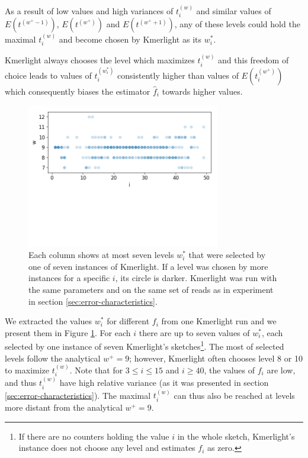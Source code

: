As a result of low values and high variances of $t_i^{(w)}$ and similar
values of $E(t^{(w^+-1)})$, $E(t^{(w^+)})$ and $E(t^{(w^++1)})$, any of these levels could
hold the maximal $t_i^{(w)}$ and become chosen by Kmerlight as its $w^*_i$. 

Kmerlight always chooses the level which maximizes $t_i^{(w)}$ and this freedom of choice 
leads to values of $t_i^{(w^*_i)}$ consistently higher than values of $E(t_i^{(w^+)})$
which consequently biases the estimator $\hat f_i$ towards higher values.

\begin{figure}[h]
\centerline{\includegraphics[width=0.75\textwidth, trim={0cm, 5.2cm, 0cm, 0cm}, clip]{images/kmerlight_wstar.png}}
\caption[$w_i^*$ selected by Kmerlight]{Each column 
shows at most seven levels $w_i^*$ that were selected by one of seven instances of Kmerlight.
If a level was chosen by more instances for a specific $i$, its circle is darker.
Kmerlight was run with the same parameters and on the same set of reads as in 
experiment in section \ref{sec:error-characteristics}.}
\label{img:w-selected-by-kmerlight}
\end{figure}

We extracted the values $w_i^*$ for different $f_i$ from one Kmerlight run
and we present them in Figure \ref{img:w-selected-by-kmerlight}.
For each $i$ there are up to seven values of $w_i^*$, each selected by one 
instance of seven Kmerlight's sketches\footnote{If there are no counters holding 
the value $i$ in the whole sketch,  Kmerlight's instance does not choose any level
and estimates $f_i$ as zero.}. The most of selected levels follow the analytical 
$w^+ = 9$; however, Kmerlight often chooses level 8 or 10 to maximize $t_i^{(w)}$. 
Note that for $3\leq i \leq 15$ and $i \geq 40$, the values of $f_i$ are low, and thus 
$t_i^{(w)}$ have high relative variance (as it was presented in section
\ref{sec:error-characteristics}). The maximal $t_i^{(w)}$ can thus also be reached
at levels more distant from the analytical $w^+ = 9$.

